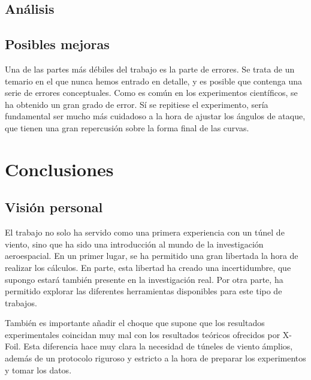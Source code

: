 \documentclass{article}
\begin{document}
\subsection{Análisis}

\subsection{Posibles mejoras}

Una de las partes más débiles del trabajo es la parte de errores. Se trata de un temario en el que nunca hemos entrado 
en detalle, y es posible que contenga una serie de errores conceptuales. Como es común en los experimentos científicos, se ha
obtenido un gran grado de error. Sí se repitiese el experimento, sería fundamental ser mucho más cuidadoso a la hora de ajustar 
los ángulos de ataque, que tienen una gran repercusión sobre la forma final de las curvas. 



\section{Conclusiones}


\subsection{Visión personal}

El trabajo no solo ha servido como una primera experiencia con un túnel de viento, sino que ha sido una introducción al mundo
de la investigación aeroespacial. En un primer lugar, se ha permitido una gran libertada la hora de realizar los cálculos. 
En parte, esta libertad ha creado una incertidumbre, que supongo estará también presente en la investigación real. Por otra parte,
ha permitido explorar las diferentes herramientas disponibles para este tipo de trabajos. 

También es importante añadir el choque que supone que los resultados experimentales coincidan muy mal con los resultados 
teóricos ofrecidos por X-Foil. Esta diferencia hace muy clara la necesidad de túneles de viento ámplios, 
además de un protocolo riguroso y estricto a la hora de preparar los experimentos y tomar los datos.

%
%
%
%

\printbibliography
\end{document}
